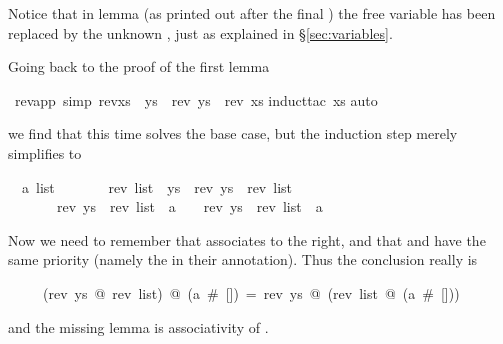 \begin{isabellebody}
\begin{isamarkuptext}
Notice that in lemma 
(as printed out after the final ) the free variable  has been
replaced by the unknown , just as explained in
\S\ref{sec:variables}.

Going back to the proof of the first lemma%
\end{isamarkuptext}%
\ rev{\isacharunderscore}app\ {\isacharbrackleft}simp{\isacharbrackright}{\isacharcolon}\ {\isachardoublequote}rev{\isacharparenleft}xs\ {\isacharat}\ ys{\isacharparenright}\ {\isacharequal}\ {\isacharparenleft}rev\ ys{\isacharparenright}\ {\isacharat}\ {\isacharparenleft}rev\ xs{\isacharparenright}{\isachardoublequote}\isanewline
{}induct{\isacharunderscore}tac\ xs{\isacharparenright}\isanewline
{}auto{\isacharparenright}%
\begin{isamarkuptxt}%
\noindent
we find that this time  solves the base case, but the
induction step merely simplifies to
\begin{isabelle}%
\ {}{\isachardot}\ {\isasymAnd}a\ list{\isachardot}\isanewline
\ \ \ \ \ \ \ rev\ {\isacharparenleft}list\ {\isacharat}\ ys{\isacharparenright}\ {\isacharequal}\ rev\ ys\ {\isacharat}\ rev\ list\ {\isasymLongrightarrow}\isanewline
\ \ \ \ \ \ \ {\isacharparenleft}rev\ ys\ {\isacharat}\ rev\ list{\isacharparenright}\ {\isacharat}\ a\ {\isacharhash}\ {\isacharbrackleft}{\isacharbrackright}\ {\isacharequal}\ rev\ ys\ {\isacharat}\ rev\ list\ {\isacharat}\ a\ {\isacharhash}\ {\isacharbrackleft}{\isacharbrackright}%
\end{isabelle}
Now we need to remember that \isa{{\isacharat}} associates to the right, and that
\isa{{\isacharhash}} and \isa{{\isacharat}} have the same priority (namely the 
in their  annotation). Thus the conclusion really is
\begin{isabelle}
~~~~~(rev~ys~@~rev~list)~@~(a~\#~[])~=~rev~ys~@~(rev~list~@~(a~\#~[]))
\end{isabelle}
and the missing lemma is associativity of \isa{{\isacharat}}.%
\end{isamarkuptxt}%
%
\end{isabellebody}
